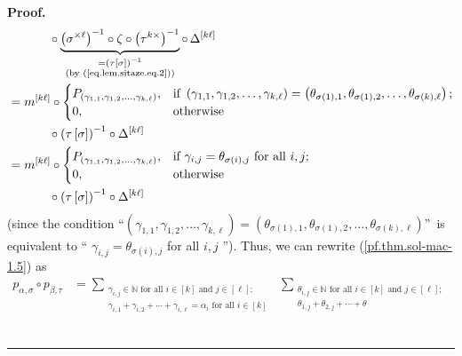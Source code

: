 \documentclass[numbers=enddot,12pt,final,onecolumn,notitlepage]{scrartcl}%
\theoremstyle{definition}
\newenvironment{proof}[1][Proof]{\noindent\textbf{#1.} }{\ \rule{0.5em}{0.5em}}
\let\sumnonlimits\sum
\renewcommand{\sum}{\sumnonlimits\limits}
\begin{document}
\begin{proof}
\begin{align*}
&  \ \ \ \ \ \ \ \ \ \ \circ\underbrace{\left(  \sigma^{\times\ell}\right)
^{-1}\circ\zeta\circ\left(  \tau^{k\times}\right)  ^{-1}}_{\substack{=\left(
\tau\left[  \sigma\right]  \right)  ^{-1}\\\text{(by (\ref{eq.lem.sitaze.eq.2}%
))}}}\circ\,\Delta^{\left[  k\ell\right]  }\\
&  =m^{\left[  k\ell\right]  }\circ%
\begin{cases}
P_{\left(  \gamma_{1,1},\gamma_{1,2},\ldots,\gamma_{k,\ell}\right)  }, &
\text{if }\left(  \gamma_{1,1},\gamma_{1,2},\ldots,\gamma_{k,\ell}\right)
=\left(  \theta_{\sigma\left(  1\right)  ,1},\theta_{\sigma\left(  1\right)
,2},\ldots,\theta_{\sigma\left(  k\right)  ,\ell}\right)  ;\\
0, & \text{otherwise}%
\end{cases}
\\
&  \ \ \ \ \ \ \ \ \ \ \circ\left(  \tau\left[  \sigma\right]  \right)
^{-1}\circ\Delta^{\left[  k\ell\right]  }\\
&  =m^{\left[  k\ell\right]  }\circ%
\begin{cases}
P_{\left(  \gamma_{1,1},\gamma_{1,2},\ldots,\gamma_{k,\ell}\right)  }, &
\text{if }\gamma_{i,j}=\theta_{\sigma\left(  i\right)  ,j}\text{ for all
}i,j;\\
0, & \text{otherwise}%
\end{cases}
\\
&  \ \ \ \ \ \ \ \ \ \ \circ\left(  \tau\left[  \sigma\right]  \right)
^{-1}\circ\Delta^{\left[  k\ell\right]  }%
\end{align*}
(since the condition \textquotedblleft$\left(  \gamma_{1,1},\gamma
_{1,2},\ldots,\gamma_{k,\ell}\right)  =\left(  \theta_{\sigma\left(  1\right)
,1},\theta_{\sigma\left(  1\right)  ,2},\ldots,\theta_{\sigma\left(  k\right)
,\ell}\right)  $\textquotedblright\ is equivalent to \textquotedblleft%
$\gamma_{i,j}=\theta_{\sigma\left(  i\right)  ,j}$ for all $i,j$%
\textquotedblright). Thus, we can rewrite (\ref{pf.thm.sol-mac-1.5}) as%
\begin{align*}
p_{\alpha,\sigma}\circ p_{\beta,\tau}  &  =\sum_{\substack{\gamma_{i,j}%
\in\mathbb{N}\text{ for all }i\in\left[  k\right]  \text{ and }j\in\left[
\ell\right]  ;\\\gamma_{i,1}+\gamma_{i,2}+\cdots+\gamma_{i,\ell}=\alpha
_{i}\text{ for all }i\in\left[  k\right]  }}\ \ \sum_{\substack{\theta
_{i,j}\in\mathbb{N}\text{ for all }i\in\left[  k\right]  \text{ and }%
j\in\left[  \ell\right]  ;\\\theta_{1,j}+\theta_{2,j}+\cdots+\theta
}}
\end{align*}
\end{proof}
\end{document}
